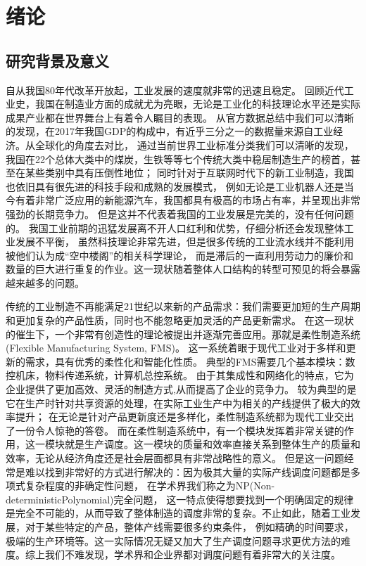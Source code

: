\chapter{绪论}

\section{研究背景及意义}
自从我国80年代改革开放起，工业发展的速度就非常的迅速且稳定。
回顾近代工业史，我国在制造业方面的成就尤为亮眼，无论是工业化的科技理论水平还是实际成果产业都在世界舞台上有着令人瞩目的表现。
从官方数据总结中我们可以清晰的发现，在2017年我国GDP的构成中，有近乎三分之一的数据量来源自工业经济。从全球化的角度去对比，
通过当前世界工业标准分类我们可以清晰的发现，我国在22个总体大类中的煤炭，生铁等等七个传统大类中稳居制造生产的榜首，甚至在某些类别中具有压倒性地位；
同时针对于互联网时代下的新工业制造，我国也依旧具有很先进的科技手段和成熟的发展模式，
例如无论是工业机器人还是当今有着非常广泛应用的新能源汽车，我国都具有极高的市场占有率，并呈现出非常强劲的长期竞争力。
但是这并不代表着我国的工业发展是完美的，没有任何问题的。
我国工业前期的迅猛发展离不开人口红利和优势，仔细分析还会发现整体工业发展不平衡，
虽然科技理论非常先进，但是很多传统的工业流水线并不能利用被他们认为成“空中楼阁”的相关科学理论，
而是滞后的一直利用劳动力的廉价和数量的巨大进行重复的作业。这一现状随着整体人口结构的转型可预见的将会暴露越来越多的问题\cite{郭朝先2018改革开放40年中国工业发展主要成就与基本经验}。

传统的工业制造不再能满足21世纪以来新的产品需求：我们需要更加短的生产周期和更加复杂的产品性质，同时也不能忽略更加灵活的产品更新需求。
在这一现状的催生下，一个非常有创造性的理论被提出并逐渐完善应用。那就是柔性制造系统(Flexible Manufacturing System, FMS)。
这一系统着眼于现代工业对于多样和更新的需求，具有优秀的柔性化和智能化性质。
典型的FMS需要几个基本模块：数控机床，物料传递系统，计算机总控系统。
由于其集成性和网络化的特点，它为企业提供了更加高效、灵活的制造方式,从而提高了企业的竞争力。
较为典型的是它在生产时针对共享资源的处理，在实际工业生产中为相关的产线提供了极大的效率提升；
在无论是针对产品更新度还是多样化，柔性制造系统都为现代工业交出了一份令人惊艳的答卷\cite{李诚2015基于Petri网和启发式搜索的调度算法研究}\cite{金炳娥2010基于Petri网的柔性制造系统调度问题的研究}。
而在柔性制造系统中，有一个模块发挥着非常关键的作用，这一模块就是生产调度。这一模块的质量和效率直接关系到整体生产的质量和效率，无论从经济角度还是社会层面都具有非常战略性的意义。
但是这一问题经常是难以找到非常好的方式进行解决的：因为极其大量的实际产线调度问题都是多项式复杂程度的非确定性问题，
在学术界我们称之为NP(Non-deterministicPolynomial)完全问题\cite{李诚2015基于Petri网和启发式搜索的调度算法研究}\cite{李昭智1984NP-完全问题浅谈}，
这一特点使得想要找到一个明确固定的规律是完全不可能的，从而导致了整体制造的调度非常的复杂。不止如此，随着工业发展，对于某些特定的产品，整体产线需要很多约束条件，
例如精确的时间要求，极端的生产环境等。这一实际情况无疑又加大了生产调度问题寻求更优方法的难度。综上我们不难发现，学术界和企业界都对调度问题有着非常大的关注度。

